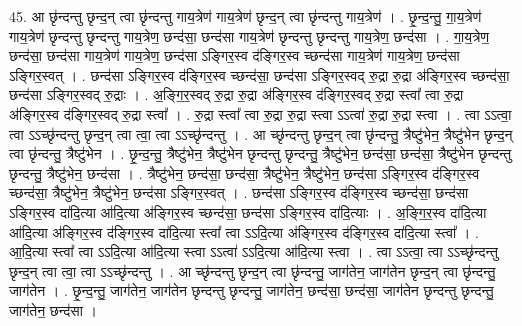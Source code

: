 \documentclass[17pt]{extarticle}
\begin{document}
45. आ छृ॑न्दन्तु छृन्द॒न् त्वा छृ॑न्दन्तु गाय॒त्रेण॑ गाय॒त्रेण॑ छृन्द॒न् त्वा छृ॑न्दन्तु गाय॒त्रेण॑ । . छृ॒न्द॒न्तु॒ गा॒य॒त्रेण॑ गाय॒त्रेण॑ छृन्दन्तु छृन्दन्तु गाय॒त्रेण॒ छन्द॑सा॒ छन्द॑सा गाय॒त्रेण॑ छृन्दन्तु छृन्दन्तु गाय॒त्रेण॒ छन्द॑सा । . गा॒य॒त्रेण॒ छन्द॑सा॒ छन्द॑सा गाय॒त्रेण॑ गाय॒त्रेण॒ छन्द॑सा ऽङ्गिर॒स्व द॑ङ्गिर॒स्व च्छन्द॑सा गाय॒त्रेण॑ गाय॒त्रेण॒ छन्द॑सा ऽङ्गिर॒स्वत् । . छन्द॑सा ऽङ्गिर॒स्व द॑ङ्गिर॒स्व च्छन्द॑सा॒ छन्द॑सा ऽङ्गिर॒स्वद् रु॒द्रा रु॒द्रा अ॑ङ्गिर॒स्व च्छन्द॑सा॒ छन्द॑सा ऽङ्गिर॒स्वद् रु॒द्राः । . अ॒ङ्गि॒र॒स्वद् रु॒द्रा रु॒द्रा अ॑ङ्गिर॒स्व द॑ङ्गिर॒स्वद् रु॒द्रा स्त्वा᳚ त्वा रु॒द्रा अ॑ङ्गिर॒स्व द॑ङ्गिर॒स्वद् रु॒द्रा स्त्वा᳚ । . रु॒द्रा स्त्वा᳚ त्वा रु॒द्रा रु॒द्रा स्त्वा ऽऽत्वा॑ रु॒द्रा रु॒द्रा स्त्वा । . त्वा ऽऽत्वा॒ त्वा ऽऽच्छृ॑न्दन्तु छृन्द॒न् त्वा त्वा॒ त्वा ऽऽच्छृ॑न्दन्तु । . आ च्छृ॑न्दन्तु छृन्द॒न् त्वा छृ॑न्दन्तु॒ त्रैष्टु॑भेन॒ त्रैष्टु॑भेन छृन्द॒न् त्वा छृ॑न्दन्तु॒ त्रैष्टु॑भेन । . छृ॒न्द॒न्तु॒ त्रैष्टु॑भेन॒ त्रैष्टु॑भेन छृन्दन्तु छृन्दन्तु॒ त्रैष्टु॑भेन॒ छन्द॑सा॒ छन्द॑सा॒ त्रैष्टु॑भेन छृन्दन्तु छृन्दन्तु॒ त्रैष्टु॑भेन॒ छन्द॑सा । . त्रैष्टु॑भेन॒ छन्द॑सा॒ छन्द॑सा॒ त्रैष्टु॑भेन॒ त्रैष्टु॑भेन॒ छन्द॑सा ऽङ्गिर॒स्व द॑ङ्गिर॒स्व च्छन्द॑सा॒ त्रैष्टु॑भेन॒ त्रैष्टु॑भेन॒ छन्द॑सा ऽङ्गिर॒स्वत् । . छन्द॑सा ऽङ्गिर॒स्व द॑ङ्गिर॒स्व च्छन्द॑सा॒ छन्द॑सा ऽङ्गिर॒स्व दा॑दि॒त्या आ॑दि॒त्या अ॑ङ्गिर॒स्व च्छन्द॑सा॒ छन्द॑सा ऽङ्गिर॒स्व दा॑दि॒त्याः । . अ॒ङ्गि॒र॒स्व दा॑दि॒त्या आ॑दि॒त्या अ॑ङ्गिर॒स्व द॑ङ्गिर॒स्व दा॑दि॒त्या स्त्वा᳚ त्वा ऽऽदि॒त्या अ॑ङ्गिर॒स्व द॑ङ्गिर॒स्व दा॑दि॒त्या स्त्वा᳚ । . आ॒दि॒त्या स्त्वा᳚ त्वा ऽऽदि॒त्या आ॑दि॒त्या स्त्वा ऽऽत्वा॑ ऽऽदि॒त्या आ॑दि॒त्या स्त्वा । . त्वा ऽऽत्वा॒ त्वा ऽऽच्छृ॑न्दन्तु छृन्द॒न् त्वा त्वा॒ त्वा ऽऽच्छृ॑न्दन्तु । . आ च्छृ॑न्दन्तु छृन्द॒न् त्वा छृ॑न्दन्तु॒ जाग॑तेन॒ जाग॑तेन छृन्द॒न् त्वा छृ॑न्दन्तु॒ जाग॑तेन । . छृ॒न्द॒न्तु॒ जाग॑तेन॒ जाग॑तेन छृन्दन्तु छृन्दन्तु॒ जाग॑तेन॒ छन्द॑सा॒ छन्द॑सा॒ जाग॑तेन छृन्दन्तु छृन्दन्तु॒ जाग॑तेन॒ छन्द॑सा । \newline
\end{document}
